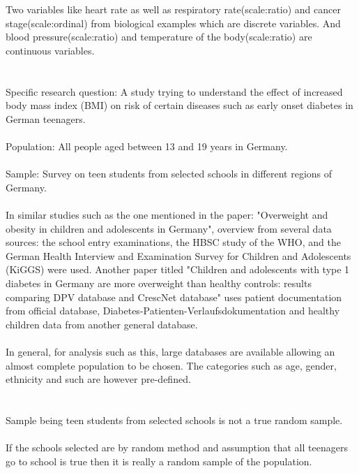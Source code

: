 \documentclass[a4paper,12pt]{article}
\newcommand{\<}{\langle}
\renewcommand{\>}{\rangle}
\newcommand{\1}{\mathbbm{1}}
\begin{document}
\section{}
Two variables like heart rate as well as respiratory rate(scale:ratio) and cancer stage(scale:ordinal) from biological examples which are discrete variables. And blood pressure(scale:ratio) and temperature of the body(scale:ratio) are continuous variables.
\section{}

Specific research question: A study trying to understand the effect of increased body mass index (BMI) on risk of certain diseases such as early onset diabetes in German teenagers. \\\\
Population: All people aged between 13 and 19 years in Germany. \\\\
Sample: Survey on teen students from selected schools in different regions of Germany. \\\\ 
In similar studies such as the one mentioned in the paper: "Overweight and obesity in children and adolescents in Germany", overview from several data sources: the school entry examinations, the HBSC study of the WHO, and the German Health Interview and Examination Survey for Children and Adolescents (KiGGS) were used.
Another paper titled "Children and adolescents with type 1 diabetes in Germany are more overweight than healthy controls: results comparing DPV database and CrescNet database" uses patient documentation from official database, Diabetes-Patienten-Verlaufsdokumentation and healthy children data from another general database.\\\\
In general, for analysis such as this, large databases are available allowing an almost complete population to be chosen. The categories such as age, gender, ethnicity and such are however pre-defined.
    

\section{}
Sample being teen students from selected schools is not a true random sample.\\\\
If the schools selected are by random method and assumption that all teenagers go to school is true then it is really a random sample of the population.
\end{document}
